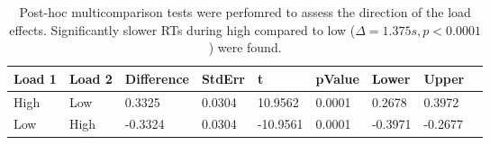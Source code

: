 \begin{table}
\centering
\begin{tabular}[0.2em]{@{}lllllllll@{}}\toprule
Load 1 & Load 2 & Difference & StdErr & t & pValue & Lower & Upper\\\toprule[0.2em]
High & Low & 0.3325 & 0.0304 & 10.9562 & 0.0001 & 0.2678 & 0.3972 \\\midrule
Low & High & -0.3324 & 0.0304 & -10.9561 & 0.0001 & -0.3971 & -0.2677 \\\bottomrule[0.2em]
\end{tabular}
\caption{Post-hoc multicomparison tests were perfomred to assess the direction of the load effects. Significantly slower RTs during high compared to low ($\Delta=1.375s,p<0.0001$) were found.\label{tabel:behStudy2RTphLoad}}
\end{table}
